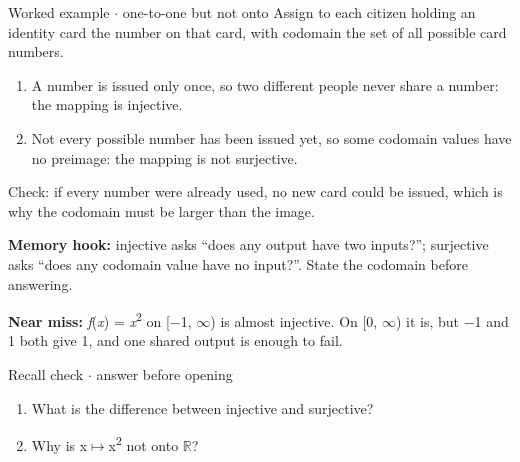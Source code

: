 \documentclass[11pt]{article}
\begin{document}
\begin{keepsection}
\begin{workedbox}{Worked example \ensuremath{\cdot} one-to-one but not onto}
Assign to each citizen holding an identity card the number on that card, with codomain the set of all possible card numbers.

\begin{enumerate}
\item A number is issued only once, so two different people never share a number: the mapping is injective.
\item Not every possible number has been issued yet, so some codomain values have no preimage: the mapping is not surjective.
\end{enumerate}

Check: if every number were already used, no new card could be issued, which is why the codomain must be larger than the image.
\end{workedbox}

\begin{notebox}\textbf{Memory hook:} injective asks “does any output have two inputs?”; surjective asks “does any codomain value have no input?”. State the codomain before answering.\end{notebox}

\begin{notebox}\textbf{Near miss:} \textit{f}(\textit{x}) = \textit{x}\textsuperscript{2} on [\ensuremath{-}1, \ensuremath{\infty}) is almost injective. On [0, \ensuremath{\infty}) it is, but \ensuremath{-}1 and 1 both give 1, and one shared output is enough to fail.\end{notebox}

\begin{recallbox}{Recall check \ensuremath{\cdot} answer before opening}
\begin{enumerate}
\item What is the difference between injective and surjective?
\item Why is x\ensuremath{\mapsto}x\textsuperscript{2} not onto \ensuremath{\mathbb{R}}?
\end{enumerate}

\end{recallbox}
\end{keepsection}
\end{document}
